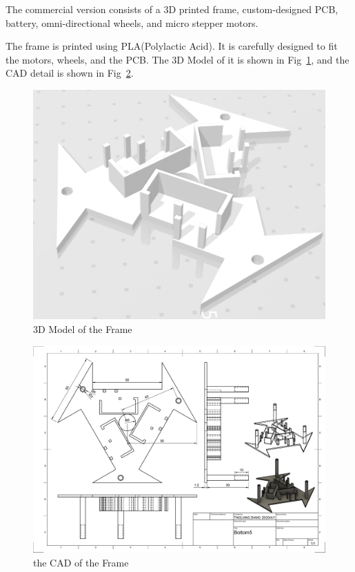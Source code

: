 \documentclass[sigconf]{acmart}
\begin{document}
The commercial version consists of a 3D printed frame, custom-designed PCB, battery, omni-directional wheels, and micro stepper motors.

The frame is printed using PLA(Polylactic Acid). It is carefully designed to fit the motors, wheels, and the PCB. The 3D Model of it is shown in Fig~\ref{fig:Frame}, and the CAD detail is shown in Fig~\ref{fig:CAD}.

\begin{figure}[h]
  \centering
  \includegraphics[width=\linewidth]{Frame.png}
  \caption{3D Model of the Frame}
  \label{fig:Frame}
\end{figure}

\begin{figure}[h]
  \centering
  \includegraphics[width=\linewidth]{Bottom.pdf}
  \caption{the CAD of the Frame}
  \label{fig:CAD}
\end{figure}
\end{document}
